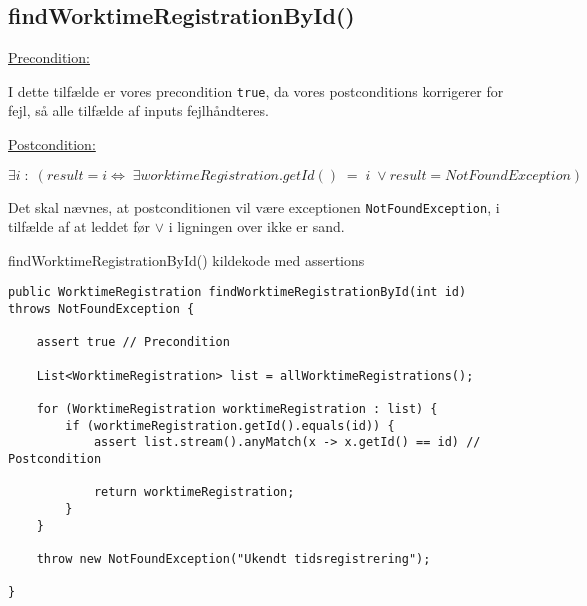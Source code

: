 \subsection{findWorktimeRegistrationById()} \label{sec:contract_findd_work}
\noindent \underline{Precondition:}
\vspace{4pt}


I dette tilfælde er vores precondition \texttt{true}, da vores postconditions korrigerer for fejl, så alle tilfælde af inputs fejlhåndteres.
\vspace{4pt}

\noindent
\underline{Postcondition:}
\vspace{4pt}

\begin{equation}
    \exists i\; :\; (result = i \iff\; \exists worktimeRegistration.getId() \; = \; i\; \lor result = NotFoundException)
\end{equation}\label{postcondition 1}
\vspace{4pt}

Det skal nævnes, at postconditionen vil være exceptionen \texttt{NotFoundException}, i tilfælde af at leddet før $\lor$ i ligningen over ikke er sand.


\begin{listing}[H]
    \centering
    \caption{findWorktimeRegistrationById() kildekode med assertions}\label{lst:find_work_time_registration_by_id_assertions}
    \begin{verbatim}
public WorktimeRegistration findWorktimeRegistrationById(int id) throws NotFoundException {

    assert true // Precondition
    
    List<WorktimeRegistration> list = allWorktimeRegistrations();

    for (WorktimeRegistration worktimeRegistration : list) {
        if (worktimeRegistration.getId().equals(id)) {
            assert list.stream().anyMatch(x -> x.getId() == id) // Postcondition
            
            return worktimeRegistration;
        }
    }

    throw new NotFoundException("Ukendt tidsregistrering");

}
    \end{verbatim}
\end{listing}


